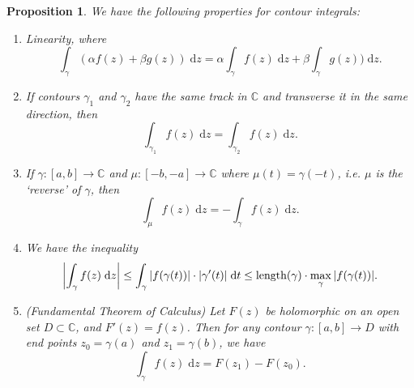 \documentclass[letter-paper]{tufte-book}
\newtheorem{proposition}[theorem]{\color{pastel-blue}Proposition}
\begin{document}
\begin{proposition}
  We have the following properties for contour integrals:
  \begin{enumerate}
    \item Linearity, where
    \begin{equation*}
      \int_\gamma (\alpha f(z) + \beta g(z))\; \mathrm{d}z = \alpha \int_\gamma f(z)\; \mathrm{d}z + \beta \int_\gamma g(z))\; \mathrm{d}z.
    \end{equation*}
    
    \item If contours $\gamma_1$ and $\gamma_2$ have the same track in
    $\mathbb{C}$ and transverse it in the same direction, then
    \begin{equation*}
      \int_{\gamma_1} f(z)\; \mathrm{d}z = \int_{\gamma_2} f(z)\; \mathrm{d}z.
    \end{equation*}
    
    \item If $\gamma : [a,b] \to \mathbb{C}$ and $\mu : [-b, -a] \to \mathbb{C}$
    where $\mu(t) = \gamma(-t)$, i.e. $\mu$ is the `reverse' of $\gamma$, then
    \begin{equation*}
      \int_{\mu} f(z)\; \mathrm{d}z = -\int_{\gamma} f(z)\; \mathrm{d}z.
    \end{equation*}
    
    \item We have the inequality
    \begin{equation*}
      \left|\int_\gamma f(z)\; \mathrm{d}z\right| \leq \int_\gamma |f(\gamma(t))| \cdot |\gamma'(t)|\; \mathrm{d}t \leq \textnormal{length}(\gamma) \cdot \max_{\gamma} |f(\gamma(t))|.
    \end{equation*}
    
    \item (Fundamental Theorem of Calculus) Let $F(z)$ be holomorphic on an open
    set $D \subset \mathbb{C}$, and $F'(z) = f(z)$. Then for any contour $\gamma
    : [a,b] \to D$ with end points $z_0 = \gamma(a)$ and $z_1 = \gamma(b)$, we
    have
    \begin{equation*}
      \int_\gamma f(z)\; \mathrm{d}z = F(z_1) - F(z_0).
    \end{equation*}
  \end{enumerate}
\end{proposition}
\end{document}
